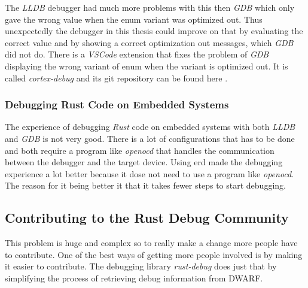 The \emph{LLDB} debugger had much more problems with this then \emph{GDB} which only gave the wrong value when the enum variant was optimized out.
Thus unexpectedly the debugger in this thesis could improve on that by evaluating the correct value and by showing a correct optimization out messages, which \emph{GDB} did not do.
There is a \emph{VSCode} extension that fixes the problem of \emph{GDB} displaying the wrong variant of enum when the variant is optimized out.
It is called \emph{cortex-debug} and its git repository can be found here \cite{cortex-debug}.


\subsubsection{Debugging Rust Code on Embedded Systems}
The experience of debugging \emph{Rust} code on embedded systems with both \emph{LLDB} and \emph{GDB} is not very good.
There is a lot of configurations that has to be done and both require a program like \emph{openocd} that handles the communication between the debugger and the target device.
Using \gls{erd} made the debugging experience a lot better because it dose not need to use a program like \emph{openocd}.
The reason for it being better it that it takes fewer steps to start debugging.


\subsection{Contributing to the Rust Debug Community}
This problem is huge and complex so to really make a change more people have to contribute.
One of the best ways of getting more people involved is by making it easier to contribute.
The debugging library \emph{rust-debug} does just that by simplifying the process of retrieving debug information from \gls{DWARF}.

